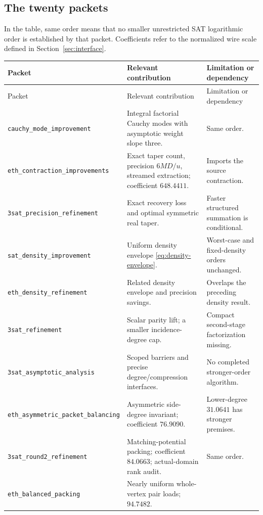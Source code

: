 \subsection{The twenty packets}
In the table, same order means that no smaller unrestricted SAT
logarithmic order is established by that packet. Coefficients refer to
the normalized wire scale defined in Section~\ref{sec:interface}.
\small
\begin{longtable}{@{}>{\raggedright\arraybackslash}p{}>{\raggedright\arraybackslash}p{}>{\raggedright\arraybackslash}p{}@{}}
\toprule
Packet & Relevant contribution & Limitation or dependency\\\midrule
\endfirsthead
\toprule
Packet & Relevant contribution & Limitation or dependency\\\midrule
\endhead
\nolinkurl{cauchy_mode_improvement} &
Integral factorial Cauchy modes with asymptotic weight slope three. &
Same order.\\[4pt]
\nolinkurl{eth_contraction_improvements} &
Exact taper count, precision $6MD/u$, streamed extraction;
coefficient $648.4411$. &
Imports the source contraction.\\[4pt]
\nolinkurl{3sat_precision_refinement} &
Exact recovery loss and optimal symmetric real taper. &
Faster structured summation is conditional.\\[4pt]
\nolinkurl{sat_density_improvement} &
Uniform density envelope \eqref{eq:density-envelope}. &
Worst-case and fixed-density orders unchanged.\\[4pt]
\nolinkurl{eth_density_refinement} &
Related density envelope and precision savings. &
Overlaps the preceding density result.\\[4pt]
\nolinkurl{3sat_refinement} &
Scalar parity lift; a smaller incidence-degree cap. &
Compact second-stage factorization missing.\\[4pt]
\nolinkurl{3sat_asymptotic_analysis} &
Scoped barriers and precise degree/compression interfaces. &
No completed stronger-order algorithm.\\[4pt]
\nolinkurl{eth_asymmetric_packet_balancing} &
Asymmetric side-degree invariant; coefficient $76.9090$. &
Lower-degree $31.0641$ has stronger premises.\\[4pt]
\nolinkurl{3sat_round2_refinement} &
Matching-potential packing; coefficient $84.0663$;
actual-domain rank audit. &
Same order.\\[4pt]
\nolinkurl{eth_balanced_packing} &
Nearly uniform whole-vertex pair loads; $94.7482$. &

\end{longtable}
